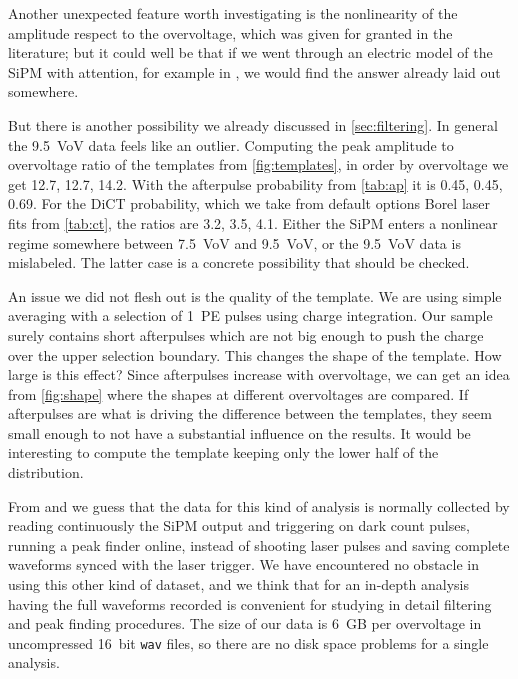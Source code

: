 
Another unexpected feature worth investigating is the nonlinearity of the
amplitude respect to the overvoltage, which was given for granted in the
literature; but it could well be that if we went through an electric model of
the SiPM with attention, for example in \cite[ch.~3]{savarese2018}, we would
find the answer already laid out somewhere.

But there is another possibility we already discussed in
\autoref{sec:filtering}. In general the \SI{9.5}{VoV} data feels like an
outlier. Computing the peak amplitude to overvoltage ratio of the templates
from \autoref{fig:templates}, in order by overvoltage we get 12.7, 12.7, 14.2.
With the afterpulse probability from \autoref{tab:ap} it is 0.45, 0.45, 0.69.
For the DiCT probability, which we take from default options Borel laser fits
from \autoref{tab:ct}, the ratios are 3.2, 3.5, 4.1. Either the SiPM enters a
nonlinear regime somewhere between \SI{7.5}{VoV} and \SI{9.5}{VoV}, or the
\SI{9.5}{VoV} data is mislabeled. The latter case is a concrete possibility
that should be checked.

An issue we did not flesh out is the quality of the template. We are using
simple averaging with a selection of 1~PE pulses using charge integration. Our
sample surely contains short afterpulses which are not big enough to push the
charge over the upper selection boundary. This changes the shape of the
template. How large is this effect? Since afterpulses increase with
overvoltage, we can get an idea from \autoref{fig:shape} where the shapes at
different overvoltages are compared. If afterpulses are what is driving the
difference between the templates, they seem small enough to not have a
substantial influence on the results. It would be interesting to compute the
template keeping only the lower half of the distribution.

From \cite{savarese2018} and \cite{nagy2014} we guess that the data for this
kind of analysis is normally collected by reading continuously the SiPM output
and triggering on dark count pulses, running a peak finder online, instead of
shooting laser pulses and saving complete waveforms synced with the laser
trigger. We have encountered no obstacle in using this other kind of dataset,
and we think that for an in-depth analysis having the full waveforms recorded
is convenient for studying in detail filtering and peak finding procedures. The
size of our data is \SI{6}{GB} per overvoltage in uncompressed \SI{16}{bit}
\texttt{wav} files, so there are no disk space problems for a single analysis.

